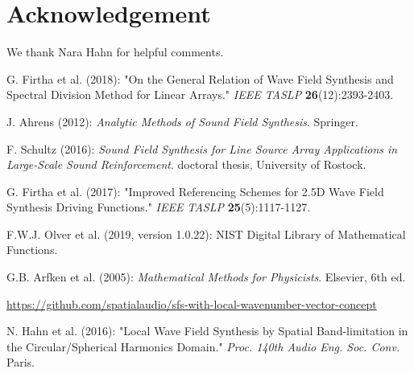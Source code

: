 \documentclass[a4paper, 10pt, twocolumn]{article}
\begin{document}
\section*{Acknowledgement}
\noindent\hspace*{2mm} We thank Nara Hahn for helpful comments.

\small
\begin{thebibliography}{99}
G. Firtha et al. (2018): "On the General Relation of Wave Field Synthesis 
and Spectral Division Method for Linear Arrays." \textit{IEEE TASLP} \textbf{26}(12):2393-2403.


J. Ahrens (2012): \textit{Analytic Methods of Sound Field Synthesis}. Springer.


F. Schultz (2016): \textit{Sound Field Synthesis for Line Source Array Applications 
in Large-Scale Sound Reinforcement}. doctoral thesis, University of Rostock.


G. Firtha et al. (2017): "Improved Referencing Schemes for 2.5D Wave Field
Synthesis Driving Functions." \textit{IEEE TASLP} \textbf{25}(5):1117-1127.


F.W.J. Olver et al. (2019, version 1.0.22): NIST Digital Library of Mathematical Functions.


G.B. Arfken et al. (2005): \textit{Mathematical Methods for Physicists}. Elsevier, 6th ed.


\url{https://github.com/spatialaudio/sfs-with-local-wavenumber-vector-concept}



N. Hahn et al. (2016): "Local Wave Field Synthesis by Spatial Band-limitation 
in the Circular/Spherical Harmonics Domain." \textit{Proc. 140th Audio Eng. Soc. Conv.}
Paris.



















\end{thebibliography}
\end{document}
